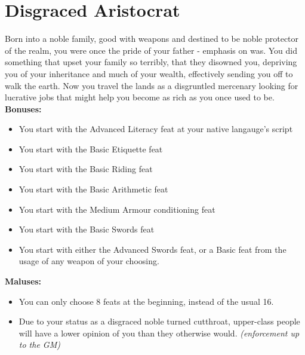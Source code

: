 \section{Disgraced Aristocrat}
Born into a noble family, good with weapons and destined to be noble protector of the realm, you were once the pride of your father - emphasis on was. You did something that upset your family so terribly, that they disowned you, depriving you of your inheritance and much of your wealth, effectively sending you off to walk the earth. Now you travel the lands as a disgruntled mercenary looking for lucrative jobs that might help you become as rich as you once used to be.\newline
\textbf{Bonuses:}
\begin{itemize}
	\item You start with the Advanced Literacy feat at your native langauge's script
	\item You start with the Basic Etiquette feat
	\item You start with the Basic Riding feat
	\item You start with the Basic Arithmetic feat
	\item You start with the Medium Armour conditioning feat
	\item You start with the Basic Swords feat
	\item You start with either the Advanced Swords feat, or a Basic feat from the usage of any weapon of your choosing.
\end{itemize}
\textbf{Maluses:}
\begin{itemize}
	\item You can only choose 8 feats at the beginning, instead of the usual 16.
	\item Due to your status as a disgraced noble turned cutthroat, upper-class people will have a lower opinion of you than they otherwise would. \textit{(enforcement up to the GM)}
\end{itemize}
